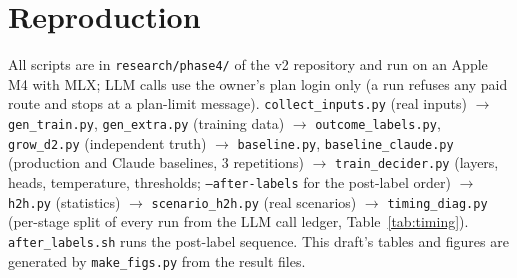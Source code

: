 \section{Reproduction}\label{sec:repro}
All scripts are in \texttt{research/phase4/} of the \sys{} v2 repository and run on an Apple M4 with MLX; LLM calls use the owner's plan login only (a run refuses any paid route and stops at a plan-limit message).
\texttt{collect\_inputs.py} (real inputs) $\to$ \texttt{gen\_train.py}, \texttt{gen\_extra.py} (training data) $\to$ \texttt{outcome\_labels.py}, \texttt{grow\_d2.py} (independent truth) $\to$ \texttt{baseline.py}, \texttt{baseline\_claude.py} (production and Claude baselines, 3 repetitions) $\to$ \texttt{train\_decider.py} (layers, heads, temperature, thresholds; \texttt{--after-labels} for the post-label order) $\to$ \texttt{h2h.py} (statistics) $\to$ \texttt{scenario\_h2h.py} (real scenarios) $\to$ \texttt{timing\_diag.py} (per-stage split of every run from the LLM call ledger, Table~\ref{tab:timing}). \texttt{after\_labels.sh} runs the post-label sequence. This draft's tables and figures are generated by \texttt{make\_figs.py} from the result files.
